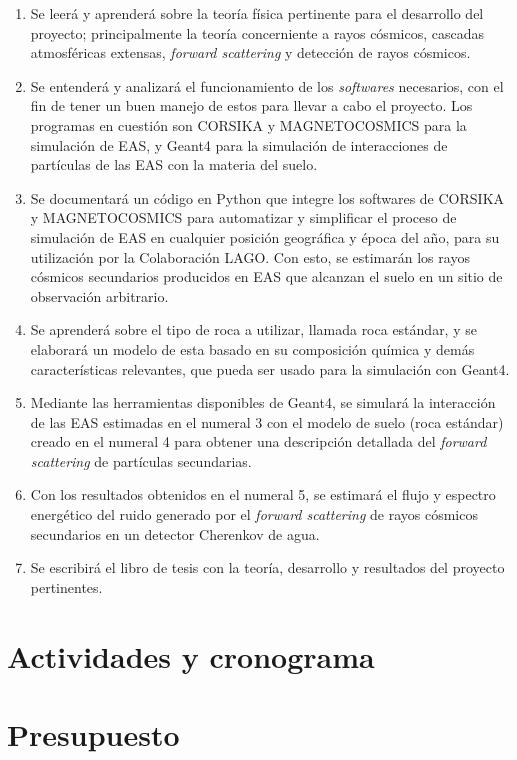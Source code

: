 \documentclass[12pt]{report}
\begin{document}
\begin{enumerate}
    \item Se leerá y aprenderá sobre la teoría física pertinente para el desarrollo del proyecto; principalmente la teoría concerniente a rayos cósmicos, cascadas atmosféricas extensas, \textit{forward scattering} y detección de rayos cósmicos.
    \item Se entenderá y analizará el funcionamiento de los \textit{softwares} necesarios, con el fin de tener un buen manejo de estos para llevar a cabo el proyecto. Los programas en cuestión son CORSIKA y MAGNETOCOSMICS para la simulación de EAS, y Geant4 para la simulación de interacciones de partículas de las EAS con la materia del suelo.
    \item Se documentará un código en Python que integre los softwares de CORSIKA y MAGNETOCOSMICS para automatizar y simplificar el proceso de simulación de EAS en cualquier posición geográfica y época del año, para su utilización por la Colaboración LAGO. Con esto, se estimarán los rayos cósmicos secundarios producidos en EAS que alcanzan el suelo en un sitio de observación arbitrario.
    \item Se aprenderá sobre el tipo de roca a utilizar, llamada roca estándar, y se elaborará un modelo de esta basado en su composición química y demás características relevantes, que pueda ser usado para la simulación con Geant4.
    \item Mediante las herramientas disponibles de Geant4, se simulará la interacción de las EAS estimadas en el numeral 3 con el modelo de suelo (roca estándar) creado en el numeral 4 para obtener una descripción detallada del \textit{forward scattering} de partículas secundarias.
    \item Con los resultados obtenidos en el numeral 5, se estimará el flujo y espectro energético del ruido generado por el \textit{forward scattering} de rayos cósmicos secundarios en un detector Cherenkov de agua.
    \item Se escribirá el libro de tesis con la teoría, desarrollo y resultados del proyecto pertinentes.
\end{enumerate}

\section*{Actividades y cronograma}

\section*{Presupuesto}




\printbibliography
\end{document}
